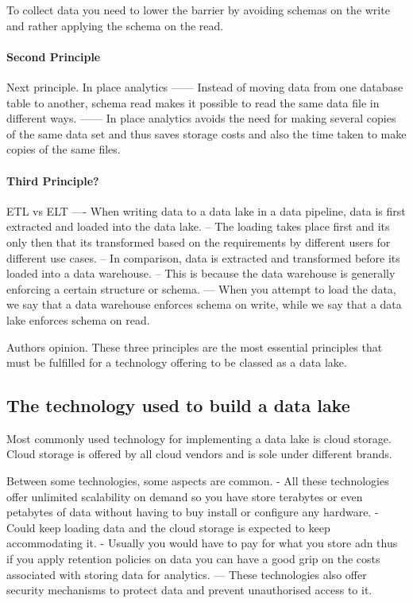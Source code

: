\documentclass[a4paper, 11pt]{article}
\begin{document}
    To collect data you need to lower the barrier by avoiding schemas on the write and rather applying the schema on the read.

    \paragraph{Second Principle}
    Next principle.
    In place analytics
    ------ Instead of moving data from one database table to another, schema read makes it possible to read the same data file in different ways.
    ------ In place analytics avoids the need for making several copies of the same data set and thus saves storage costs and also the time taken to make copies of the same files.

    \paragraph{Third Principle?}
    ETL vs ELT
    ---- When writing data to a data lake in a data pipeline, data is first extracted and loaded into the data lake.
    -- The loading takes place first and its only then that its transformed based on the requirements by different users for different use cases.
    -- In comparison, data is extracted and transformed before its loaded into a data warehouse.
    -- This is because the data warehouse is generally enforcing a certain structure or schema.
    --- When you attempt to load the data, we say that a data warehouse enforces schema on write, while we say that a data lake enforces schema on read.

    Authors opinion.
    These three principles are the most essential principles that must be fulfilled for a technology offering to be classed as a data lake.

    \subsection{The technology used to build a data lake}
    Most commonly used technology for implementing a data lake is cloud storage.
    Cloud storage is offered by all cloud vendors and is sole under different brands.

    Between some technologies, some aspects are common.
    - All these technologies offer unlimited scalability on demand so you have store terabytes or even petabytes of data without having to buy install or configure any hardware.
    - Could keep loading data and the cloud storage is expected to keep accommodating it.
    - Usually you would have to pay for what you store adn thus if you apply retention policies on data you can have a good grip on the costs associated with storing data for analytics.
    --- These technologies also offer security mechanisms to protect data and prevent unauthorised access to it.
\end{document}
